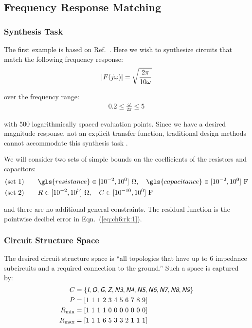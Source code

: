 \subsection{Frequency Response Matching\label{sec:ch6:freqresponse}}

\subsubsection{Synthesis Task}
The first example is based on Ref.~\cite{Grimbleby1995a}. Here we wish to synthesize circuits that match the following frequency response:
\begin{align}
\lvert F(j \omega)\rvert = \sqrt{\frac{2 \pi}{10 \omega}}
\end{align}

\noindent over the frequency range:
\begin{align*}
0.2 \leq \frac{\omega}{2\pi} \leq 5
\end{align*}

\noindent with 500 logarithmically spaced evaluation points.
Since we have a desired magnitude response, not an explicit transfer function, traditional design methods cannot accommodate this synthesis task \cite{Grimbleby1995a}.

We will consider two sets of simple bounds on the coefficients of the resistors and capacitors:
\begin{align*}
\text{(set 1)} &\qquad \gls{resistance}\in[10^{-2}, 10^{0}]\ \Omega, \quad \gls{capacitance} \in [10^{-2}, 10^{0}] \text{ F} \\
\text{(set 2)} &\qquad R\in[10^{-2}, 10^{5}]\ \Omega, \quad C \in [10^{-10}, 10^{0}] \text{ F}
\end{align*}

\noindent and there are no additional general constraints.
The residual function is the pointwise decibel error in Eqn.~(\ref{eq:ch6:rk:1}).

\subsubsection{Circuit Structure Space\label{sec:ch6:mm:css}}

The desired circuit structure space is ``all topologies that have up to 6 impedance subcircuits and a required connection to the ground.''
Such a space is captured by:
\begin{subequations}
\label{eq:ch6:lib2}
\begin{align}
C &= \{ \textsl{\textsf{I}}, \textsl{\textsf{O}}, \textsl{\textsf{G}}, \textsl{\textsf{Z}}, \textsl{\textsf{N3}}, \textsl{\textsf{N4}}, \textsl{\textsf{N5}}, \textsl{\textsf{N6}}, \textsl{\textsf{N7}}, \textsl{\textsf{N8}}, \textsl{\textsf{N9}} \} \\
P &=        \left[ 1\ 1\ 1\ 2\ 3\ 4\ 5\ 6\ 7\ 8\ 9 \right] \\
R_{\min} &= \left[ 1\ 1\ 1\ 1\ 0\ 0\ 0\ 0\ 0\ 0\ 0 \right] \\
R_{\max} &= \left[ 1\ 1\ 1\ 6\ 5\ 3\ 3\ 2\ 1\ 1\ 1 \right]
\end{align}
\end{subequations}

